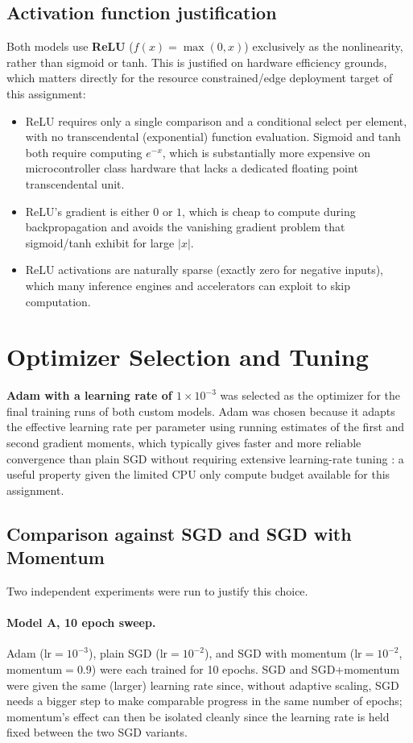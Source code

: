 \documentclass[11pt]{article}
\begin{document}
\subsection{Activation function justification}
Both models use \textbf{ReLU} ($f(x) = \max(0, x)$) exclusively as the
nonlinearity, rather than sigmoid or tanh. This is justified on
hardware efficiency grounds, which matters directly for the
resource constrained/edge deployment target of this assignment:
\begin{itemize}
  \item ReLU requires only a single comparison and a conditional select per
  element, with no transcendental (exponential) function evaluation. Sigmoid
  and tanh both require computing $e^{-x}$, which is substantially more
  expensive on microcontroller class hardware that lacks a dedicated
  floating point transcendental unit.
  \item ReLU's gradient is either $0$ or $1$, which is cheap to compute
  during backpropagation and avoids the vanishing gradient problem that
  sigmoid/tanh exhibit for large $|x|$.
  \item ReLU activations are naturally sparse (exactly zero for negative
  inputs), which many inference engines and accelerators can exploit to skip
  computation.
\end{itemize}

\section{Optimizer Selection and Tuning}
\label{sec:optimizer}

\textbf{Adam with a learning rate of $1\times10^{-3}$} was selected as the
optimizer for the final training runs of both custom models. Adam was
chosen because it adapts the effective learning rate per parameter using
running estimates of the first and second gradient moments, which typically
gives faster and more reliable convergence than plain SGD without requiring
extensive learning-rate tuning : a useful property given the limited
CPU only compute budget available for this assignment.

\subsection{Comparison against SGD and SGD with Momentum}

Two independent experiments were run to justify this choice.

\paragraph{Model A, 10 epoch sweep.} Adam ($\text{lr}=10^{-3}$), plain SGD
($\text{lr}=10^{-2}$), and SGD with momentum ($\text{lr}=10^{-2}$,
$\text{momentum}=0.9$) were each trained for 10 epochs. SGD and SGD+momentum
were given the same (larger) learning rate since, without adaptive scaling,
SGD needs a bigger step to make comparable progress in the same number of
epochs; momentum's effect can then be isolated cleanly since the learning
rate is held fixed between the two SGD variants.
\end{document}
